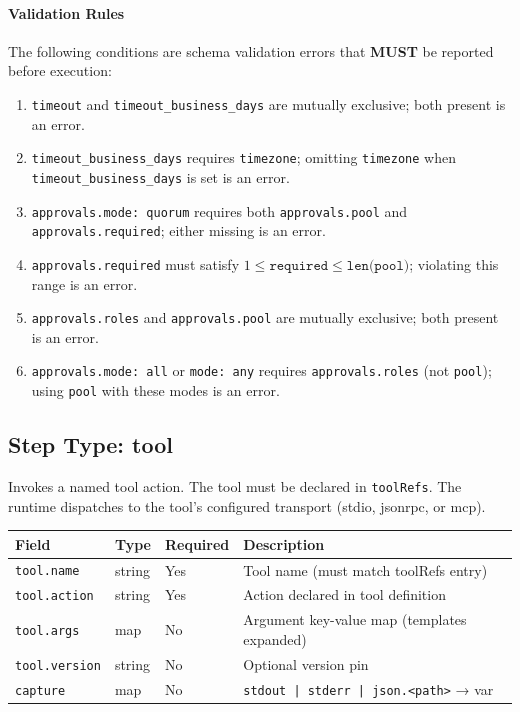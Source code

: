 \paragraph{Validation Rules}

The following conditions are schema validation errors that \textbf{MUST} be
reported before execution:

\begin{enumerate}
  \item \texttt{timeout} and \texttt{timeout\_business\_days} are mutually
        exclusive; both present is an error.
  \item \texttt{timeout\_business\_days} requires \texttt{timezone}; omitting
        \texttt{timezone} when \texttt{timeout\_business\_days} is set is an
        error.
  \item \texttt{approvals.mode: quorum} requires both \texttt{approvals.pool}
        and \texttt{approvals.required}; either missing is an error.
  \item \texttt{approvals.required} must satisfy $1 \leq \texttt{required} \leq
        \texttt{len(pool)}$; violating this range is an error.
  \item \texttt{approvals.roles} and \texttt{approvals.pool} are mutually
        exclusive; both present is an error.
  \item \texttt{approvals.mode: all} or \texttt{mode: any} requires
        \texttt{approvals.roles} (not \texttt{pool}); using \texttt{pool} with
        these modes is an error.
\end{enumerate}

\subsection{Step Type: tool}
\label{subsec:step-tool}

Invokes a named tool action.  The tool must be declared in \texttt{toolRefs}.
The runtime dispatches to the tool's configured transport (stdio, jsonrpc, or
mcp).

\begin{center}
\begin{tabular}{lllp{5cm}}
\hline
\textbf{Field} & \textbf{Type} & \textbf{Required} & \textbf{Description} \\
\hline
\texttt{tool.name}    & string & Yes & Tool name (must match toolRefs entry) \\
\texttt{tool.action}  & string & Yes & Action declared in tool definition \\
\texttt{tool.args}    & map    & No  & Argument key-value map (templates expanded) \\
\texttt{tool.version} & string & No  & Optional version pin \\
\texttt{capture}      & map    & No  & \texttt{stdout | stderr | json.<path>} → var \\
\hline
\end{tabular}
\end{center}

